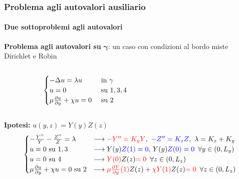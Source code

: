 \begin{frame}
 \frametitle{Problema agli autovalori ausiliario}
 \framesubtitle{Due sottoproblemi agli autovalori}
 \textbf{Problema agli autovalori su} $\boldsymbol\gamma$: un caso con condizioni al bordo miste Dirichlet e Robin
 \begin{columns}
  \begin{column}{0.6\textwidth}
\begin{equation}
    \begin{cases}
     -\Delta u = \lambda u &\text{ in }\gamma\\
     u=0 &\text{ su } 1,3,4\\
     \mu \frac{\partial u}{\partial y} + \chi u = 0 &\text{ su } 2\\
    \end{cases}
 \end{equation}
  \end{column}
  \begin{column}{0.3\textwidth}

  \end{column}
 \end{columns}
 \textbf{Ipotesi:} $u(y,z)=Y(y)Z(z)$
 {\footnotesize
 \begin{equation}
 \begin{cases}
  -\frac{Y''}{Y}-\frac{Z''}{Z} = \lambda&\longrightarrow \red{-Y''=K_yY},\psp{2} \blue{-Z''= K_zZ},\psp{2}\lambda=K_z+K_y\\
  u=0 \text{ su }1,3&\longrightarrow Y(y)\blue{Z(1)=0},\psp{1} Y(y)\blue{Z(0)=0} \psp{3}\forall y\in(0,L_y)\\
  u=0 \text{ su }4&\longrightarrow \red{Y(0)}Z(z)\red{=0} \psp{3}\forall z\in(0,L_z)\\
  \mu \dpar{u}{y} + \chi u = 0 \text{ su } 2&\longrightarrow \red{\mu \dpar{Y}{y}(1)}Z(z) + \red{\chi Y(1)}Z(z)\red{ = 0} \psp{3}\forall z\in(0,L_z)\\
  \end{cases}
 \end{equation}}
 \end{frame}
 
